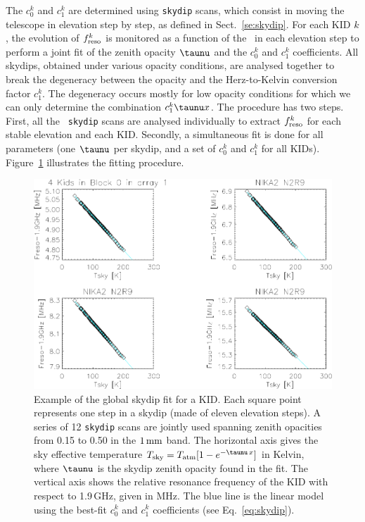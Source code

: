 The $c_0^k$ and $c_1^k$ are determined using {\tt skydip} scans, which
consist in moving the telescope in elevation step by step, as
defined in Sect.~\ref{se:skydip}. For each KID $k$, the evolution
of $f_{\rm{reso}}^k$ is monitored as a function of the \airmass\ in each
elevation step to perform a joint fit of the zenith opacity $\taunu$ and
the $c_0^k$ and $c_1^k$ coefficients.
All skydips, obtained under various opacity conditions, are analysed
together to break the degeneracy between the opacity and the
Herz-to-Kelvin conversion factor $c_1^k$. The degeneracy occurs mostly for low opacity
conditions for which we can only determine the combination
$c_1^k \taunu x$. The procedure has two steps. First, all the {\tt
skydip} scans are analysed individually to extract $f_{\rm{reso}}^k$ for each
stable elevation and each KID. Secondly, a simultaneous fit is done
for all parameters (one $\taunu$ per skydip, and a set of $c_0^k$ and
$c_1^k$ for all KIDs). Figure~\ref{fig:skydipfitexample} illustrates the
fitting procedure.
%
\begin{figure}[!htbp]
\begin{center}
\includegraphics[trim={9cm 0cm 0cm 6.5cm}, clip=true, width=0.9\linewidth]{Figures/test_allskd4_N2R9v5_5-crop.pdf}
\caption[]{Example of the global skydip fit for a KID.
Each square point represents one step in a skydip (made of eleven
elevation steps). A series of 12 {\tt skydip} scans are jointly used
spanning zenith opacities from 0.15 to 0.50 {\lp in the $1\,\rm{mm}$ band}. The horizontal axis gives the sky
effective temperature $T_{\rm{sky}} = T_{\rm{atm}}[1-e^{-\taunu\, x}]$ in Kelvin, where $\taunu$ is the
skydip zenith opacity found in the fit. The vertical axis shows the relative
resonance frequency of the KID with respect to 1.9\,GHz, given in MHz. The blue line is the linear
model using the best-fit $c_0^k$ and $c_1^k$ coefficients (see
Eq.~\ref{eq:skydip}).}
\label{fig:skydipfitexample}
\end{center}
\end{figure}
